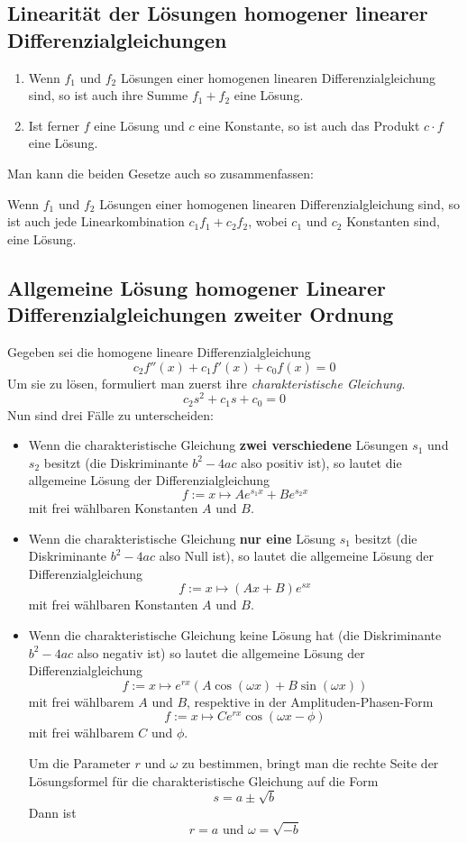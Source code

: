 \subsection{Linearität der Lösungen homogener linearer Differenzialgleichungen}

\begin{enumerate}
    \item Wenn $f_1$ und $f_2$ Lösungen einer homogenen linearen
        Differenzialgleichung sind, so ist auch ihre Summe $f_1 + f_2$ eine
        Lösung.
    \item Ist ferner $f$ eine Lösung und $c$ eine Konstante, so ist auch das
        Produkt $c \cdot f$ eine Lösung.
\end{enumerate}

Man kann die beiden Gesetze auch so zusammenfassen:

Wenn $f_1$ und $f_2$ Lösungen einer homogenen linearen Differenzialgleichung
sind, so ist auch jede Linearkombination $c_1f_1 + c_2f_2$, wobei $c_1$ und
$c_2$ Konstanten sind, eine Lösung.


\subsection{Allgemeine Lösung homogener Linearer Differenzialgleichungen
    zweiter Ordnung}

Gegeben sei die homogene lineare Differenzialgleichung
$$c_2f''(x) + c_1f'(x) + c_0f(x) = 0$$
Um sie zu lösen, formuliert man zuerst ihre \emph{charakteristische Gleichung}.
$$c_2s^2 + c_1s + c_0 = 0$$
Nun sind drei Fälle zu unterscheiden:

\begin{itemize}
    \item Wenn die charakteristische Gleichung \textbf{zwei verschiedene}
        Lösungen $s_1$ und $s_2$ besitzt (die Diskriminante $b^2 - 4ac$ also
        positiv ist), so lautet die allgemeine Lösung der Differenzialgleichung
        $$f := x \mapsto Ae^{s_1 x} + Be^{s_2 x}$$
        mit frei wählbaren Konstanten $A$ und $B$.
    \item Wenn die charakteristische Gleichung \textbf{nur eine} Lösung $s_1$
        besitzt (die Diskriminante $b^2 - 4ac$ also Null ist), so lautet die
        allgemeine Lösung der Differenzialgleichung
        $$f := x \mapsto (Ax + B)e^{sx}$$
        mit frei wählbaren Konstanten $A$ und $B$.
    \item Wenn die charakteristische Gleichung keine Lösung hat (die
        Diskriminante $b^2 - 4ac$ also negativ ist) so lautet die allgemeine
        Lösung der Differenzialgleichung
        $$f := x \mapsto e^{rx}\left(A \cos(\omega x)
            + B \sin(\omega x)\right)$$
        mit frei wählbarem $A$ und $B$, respektive in der Amplituden-Phasen-Form
        $$f := x \mapsto Ce^{rx} \cos(\omega x - \phi)$$
        mit frei wählbarem $C$ und $\phi$.

        Um die Parameter $r$ und $\omega$ zu bestimmen, bringt man die rechte
        Seite der Lösungsformel für die charakteristische Gleichung auf die Form
        $$s = a \pm \sqrt{b}$$
        Dann ist
        $$r = a \textrm{ und } \omega = \sqrt{-b}$$
\end{itemize}


